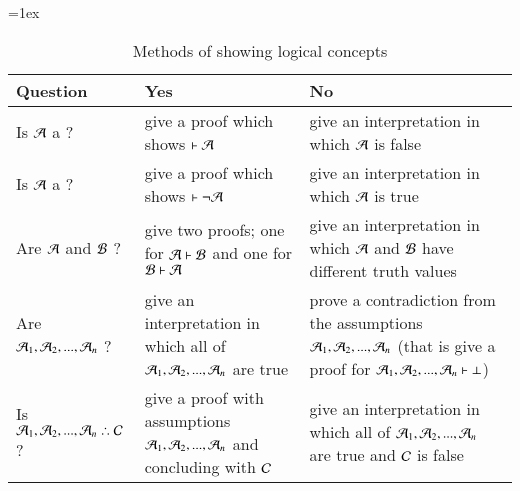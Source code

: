 \begin{table}[H]
\tabulinesep=1ex
\begin{tabu}{X[.5,c,m] ||X[1,l,m] |X[1,l,m]}
\textbf{Question} 		&	\textbf{Yes} 	&	\textbf{No} \\ \hline \hline

    Is $\mathcal{A}$ a ?  &	give a proof which shows $\vdash \mathcal{A}$ & give an interpretation in which $\mathcal{A}$ is false	 \\ \hline
 
Is $\mathcal{A}$ a ?  &	give a proof which shows $\vdash\neg \mathcal{A}$ & give an interpretation in which $\mathcal{A}$ is true	 \\ \hline

    Are $\mathcal{A}$ and $\mathcal{B}$ ? &	give two proofs; one for $\mathcal{A}\vdash \mathcal{B}$ and one for $\mathcal{B}\vdash\mathcal{A}$ & give an interpretation in which $\mathcal{A}$ and $\mathcal{B}$ have different truth values	 \\ \hline


    Are $\mathcal{A}_1,\mathcal{A}_2,...,\mathcal{A}_n$ ? &	give an interpretation in which all of $\mathcal{A}_1,\mathcal{A}_2,...,\mathcal{A}_n$ are true & prove a contradiction from the assumptions $\mathcal{A}_1,\mathcal{A}_2,...,\mathcal{A}_n$ (that is give a proof for $\mathcal{A}_1,\mathcal{A}_2,...,\mathcal{A}_n\vdash \bot$)	 \\ \hline
    Is $\metav{A}_1,\metav{A}_2,...,\metav{A}_n\therefore\metav{C}$ ? &	give a proof with assumptions $\mathcal{A}_1,\mathcal{A}_2,...,\mathcal{A}_n$ and concluding with $\mathcal{C}$ & give an interpretation in which all of $\mathcal{A}_1,\mathcal{A}_2,...,\mathcal{A}_n$ are true and $\mathcal{C}$ is false \\ \hline
\end{tabu}
\caption{Methods of showing logical concepts}
\label{table:proofs_or_interpretations}
\end{table}


